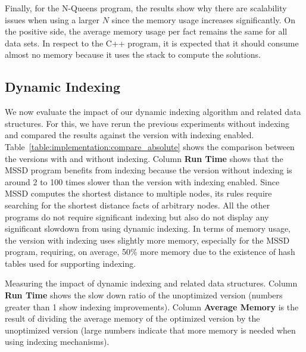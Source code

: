 Finally, for the N-Queens program, the results show why there are scalability
issues when using a larger $N$ since the memory usage increases significantly.
On the positive side, the average memory usage per fact remains the same for all
data sets. In respect to the C++ program, it is expected that it should consume
almost no memory because it uses the stack to compute the solutions.

\subsection{Dynamic Indexing}

We now evaluate the impact of our dynamic indexing algorithm and related data
structures. For this, we have rerun the previous experiments without indexing
and compared the results against the version with indexing enabled.
Table~\ref{table:implementation:compare_absolute} shows the comparison between
the versions with and without indexing.
Column \textbf{Run Time} shows that the MSSD program benefits from
indexing because the version without indexing is around 2 to 100 times slower than
the version with indexing enabled. Since MSSD computes the shortest distance to
multiple nodes, its rules require searching for the shortest distance facts of
arbitrary nodes. All the other programs do not require significant indexing but
also do not display any significant slowdown from using dynamic indexing. In
terms of memory usage, the version with indexing uses slightly more memory,
especially for the MSSD program, requiring, on average, 50\% more memory due to
the existence of hash tables used for supporting indexing.

\begin{table}[ht]
   \begin{center}
      
   \end{center}

   \caption{Measuring the impact of dynamic indexing and related data
      structures. Column \textbf{Run Time} shows the slow down ratio of the
      unoptimized version (numbers greater than 1 show indexing improvements).
      Column \textbf{Average Memory} is the result of dividing the average
   memory of the optimized version by the unoptimized version (large numbers
indicate that more memory is needed when using indexing mechanisms).}

   \label{table:implementation:compare_absolute}
\end{table}

